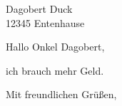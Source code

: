 \documentclass[12pt,ngerman]{scrlttr2}
\begin{document}
\begin{letter}{Dagobert Duck \\ 12345 Entenhause}
\opening{Hallo Onkel Dagobert,}

ich brauch mehr Geld.

\closing{Mit freundlichen Grüßen,}
\end{letter}
\end{document}
